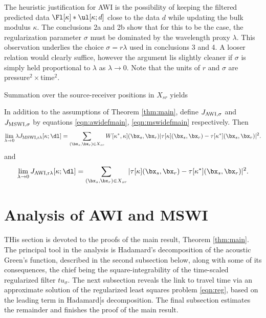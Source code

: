 The heuristic justification for AWI is the possibility of keeping the
filtered predicted data $\Fl[\kappa]*\ul[\kappa;d]$ close to the data
$d$ while updating the bulk modulus $\kappa$. The conclusions 2a and
2b show that for this to be the case, the regularization parameter $\sigma$
must be dominated by the wavelength proxy $\lambda$. This observation underlies the choice
$\sigma = r\lambda$ used in conclusions 3 and 4. A looser relation
would clearly suffice, however the argument lis slightly cleaner if
$\sigma$ is simply held proportional to $\lambda$ as $\lambda
\rightarrow 0$. Note that the units of $r$ and $\sigma$ are pressure$^2 \times$time$^2$.

Summation over the source-receiver positions in $X_{sr}$ yields
\begin{cor}
  \label{thm:cor1}
  In addition to the assumptions of Theorem \ref{thm:main}, define $J_{\rm
    AWI,\sigma}$ and $J_{\rm MSWI,\sigma}$ by equations
  \ref{eqn:awidefmain}, \ref{eqn:mswidefmain} respectively. Then
\begin{equation}
\label{eqn:cor1mswi}   
\lim_{\lambda \rightarrow 0} \lambda J_{\rm MSWI,r\lambda}[\kappa;\dl]
= \sum_{(\bx_s,\bx_r) \in X_{sr}} W[\kappa^*,\kappa](\bx_s,\bx_r) |\tau[\kappa](\bx_s,\bx_r) - \tau[\kappa^*](\bx_s,\bx_r)|^2.
\end{equation}
and
\begin{equation}
\label{eqn:cor1awi}   
\lim_{\lambda \rightarrow 0} J_{\rm AWI,r\lambda}[\kappa;\dl]
= \sum_{(\bx_s,\bx_r) \in X_{sr}}  |\tau[\kappa](\bx_s,\bx_r) - \tau[\kappa^*](\bx_s,\bx_r)|^2.
\end{equation}
\end{cor}

\section{Analysis of AWI and MSWI}
THis section is devoted to the proofs of the main result, Theorem
\ref{thm:main}.  The principal tool in the analysis is Hadamard's
decomposition of the acoustic Green's function, described in the
second
subsection below, along with some of its consequences, the chief being the
square-integrability of the time-scaled regularized filter
$tu_{\sigma}$. The next subsection reveals the link to travel time via
an approximate solution of the regularized least squares problem
\ref{eqn:reg}, based on the leading term in Hadamard[s decomposition.
The final subsection estimates the remainder and finishes the proof of
the main result.

